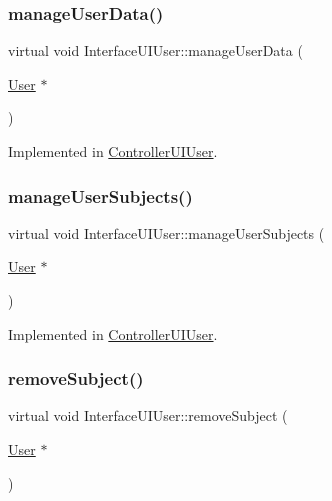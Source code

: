 \subsubsection{\texorpdfstring{manage\+User\+Data()}{manageUserData()}}
{\footnotesize\ttfamily virtual void Interface\+U\+I\+User\+::manage\+User\+Data (\begin{DoxyParamCaption}\item[{\hyperlink{class_user}{User} $\ast$}]{ }\end{DoxyParamCaption})\hspace{0.3cm}{\ttfamily [pure virtual]}}



Implemented in \hyperlink{class_controller_u_i_user_a3d496ebc4d35be9d001c543ccc605341}{Controller\+U\+I\+User}.

\mbox{\label{class_interface_u_i_user_a3830114ce74533d9ba66b0baaac79f0b}} 
\subsubsection{\texorpdfstring{manage\+User\+Subjects()}{manageUserSubjects()}}
{\footnotesize\ttfamily virtual void Interface\+U\+I\+User\+::manage\+User\+Subjects (\begin{DoxyParamCaption}\item[{\hyperlink{class_user}{User} $\ast$}]{ }\end{DoxyParamCaption})\hspace{0.3cm}{\ttfamily [pure virtual]}}



Implemented in \hyperlink{class_controller_u_i_user_a6a3a889cc4726487baa3e2f19f646810}{Controller\+U\+I\+User}.

\mbox{\label{class_interface_u_i_user_a2f1348af12103048245fcf31e9677994}} 
\subsubsection{\texorpdfstring{remove\+Subject()}{removeSubject()}}
{\footnotesize\ttfamily virtual void Interface\+U\+I\+User\+::remove\+Subject (\begin{DoxyParamCaption}\item[{\hyperlink{class_user}{User} $\ast$}]{ }\end{DoxyParamCaption})\hspace{0.3cm}{\ttfamily [pure virtual]}}



